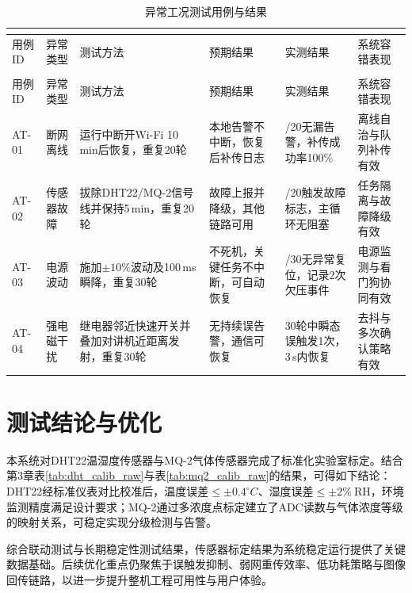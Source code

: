 \documentclass[UTF8,12pt,a4paper,oneside]{ctexbook}
\renewcommand{\arraystretch}{1.15}
\numberwithin{equation}{chapter}
\renewcommand{\thetable}{\thechapter.\arabic{table}}
\let\cite\supercite
\begin{document}
{\renewcommand{\arraystretch}{1.2}
\begin{longtable}{>{\raggedright\arraybackslash}p{1.2cm} >{\raggedright\arraybackslash}p{1.8cm} >{\raggedright\arraybackslash}p{2.6cm} >{\raggedright\arraybackslash}p{2.1cm} >{\raggedright\arraybackslash}p{2.3cm} >{\raggedright\arraybackslash}p{2.0cm}}
\caption{异常工况测试用例与结果}\\
\label{tab:abnormal_cases}\\
\toprule
用例ID & 异常类型 & 测试方法 & 预期结果 & 实测结果 & 系统容错表现 \\
\midrule
\endfirsthead
\multicolumn{6}{c}{\tablename\ \thetable\ （续）}\\
\toprule
用例ID & 异常类型 & 测试方法 & 预期结果 & 实测结果 & 系统容错表现 \\
\midrule
\endhead
\bottomrule
\endfoot
AT-01 & 断网离线 & 运行中断开Wi-Fi 10\,min后恢复，重复20轮 & 本地告警不中断，恢复后补传日志 & 20/20无漏告警，补传成功率100\% & 离线自治与队列补传有效 \\
AT-02 & 传感器故障 & 拔除DHT22/MQ-2信号线并保持5\,min，重复20轮 & 故障上报并降级，其他链路可用 & 20/20触发故障标志，主循环无阻塞 & 任务隔离与故障降级有效 \\
AT-03 & 电源波动 & 施加$\pm10\%$波动及100\,ms瞬降，重复30轮 & 不死机，关键任务不中断，可自动恢复 & 30/30无异常复位，记录2次欠压事件 & 电源监测与看门狗协同有效 \\
AT-04 & 强电磁干扰 & 继电器邻近快速开关并叠加对讲机近距离发射，重复30轮 & 无持续误告警，通信可恢复 & 30轮中瞬态误触发1次，3\,s内恢复 & 去抖与多次确认策略有效 \\
\end{longtable}
}
\section{测试结论与优化}
本系统对DHT22温湿度传感器与MQ-2气体传感器完成了标准化实验室标定。结合第3章表\ref{tab:dht_calib_raw}与表\ref{tab:mq2_calib_raw}的结果，可得如下结论：DHT22经标准仪表对比校准后，温度误差$\leq \pm0.4^\circ C$、湿度误差$\leq \pm2\%\ \mathrm{RH}$，环境监测精度满足设计要求\cite{dht_calib_source}；MQ-2通过多浓度点标定建立了ADC读数与气体浓度等级的映射关系，可稳定实现分级检测与告警\cite{mq2_calib_source}。

综合联动测试与长期稳定性测试结果，传感器标定结果为系统稳定运行提供了关键数据基础。后续优化重点仍聚焦于误触发抑制、弱网重传效率、低功耗策略与图像回传链路，以进一步提升整机工程可用性与用户体验。
\end{document}
